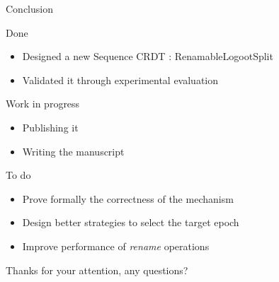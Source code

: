 \documentclass[10pt]{beamer}
\begin{document}
\begin{frame}{Conclusion}
  \begin{block}{Done}
    \vspace{-1mm}
    \begin{itemize}
      \item Designed a new Sequence \ac{CRDT} : RenamableLogootSplit
      \item Validated it through experimental evaluation
    \end{itemize}
  \end{block}

  \pause

  \begin{block}{Work in progress}
    \vspace{-1mm}
    \begin{itemize}
      \item Publishing it
      \item Writing the manuscript
    \end{itemize}
  \end{block}

  \pause

  \begin{block}{To do}
    \vspace{-1mm}
    \begin{itemize}
      \item Prove formally the correctness of the mechanism
      \item Design better strategies to select the target epoch
      \item Improve performance of \emph{rename} operations
    \end{itemize}
  \end{block}
\end{frame}

\begin{frame}[standout]
  Thanks for your attention, any questions?
  \vspace{3em}
  \begin{center}
    \ccby
  \end{center}
\end{frame}
\end{document}
